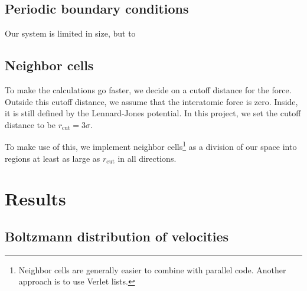 \documentclass[reprint,floatfix,amsmath,amssymb,aps,pra]{revtex4-1}
\begin{document}
\subsection{Periodic boundary conditions}

Our system is limited in size, but to 

\subsection{Neighbor cells}

To make the calculations go faster, we decide on a cutoff distance for the force. Outside this cutoff distance, we assume that the interatomic force is zero. Inside, it is still defined by the Lennard-Jones potential. In this project, we set the cutoff distance to be $r_{\text{cut}} = 3 \sigma$.

To make use of this, we implement neighbor cells\footnote{Neighbor cells are generally easier to combine with parallel code. Another approach is to use Verlet lists.} as a division of our space into regions at least as large as $r_{\text{cut}}$ in all directions.

\section{Results}

\subsection{Boltzmann distribution of velocities}
\end{document}
